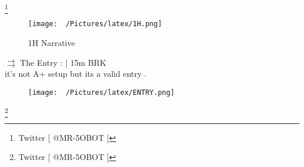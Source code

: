 \documentclass{article}
\begin{document}
\footnote{Twitter [ @MR-5OBOT ]}
\newpage

\vspace{0.1cm}
\begin{figure}[h!]
\caption{1H Narrative}
  \begin{adjustbox}{width=1.1\textwidth,center}
  \texttt{[image: ~/Pictures/latex/1H.png]}
\end{adjustbox}
  \label{fig:image}
\end{figure}

\noindent \( \rightrightarrows \) \hspace{0.1cm}The Entry : |  15m BRK \\ \vspace{0.2cm} it's not A+ setup but its a valid entry .
\begin{figure}[h!]
  \begin{adjustbox}{width=1.1\textwidth,center}
  \texttt{[image: ~/Pictures/latex/ENTRY.png]}
\end{adjustbox}
\label{fig:image}
\end{figure}
\footnote{Twitter [ @MR-5OBOT ]}



%
\end{document}
